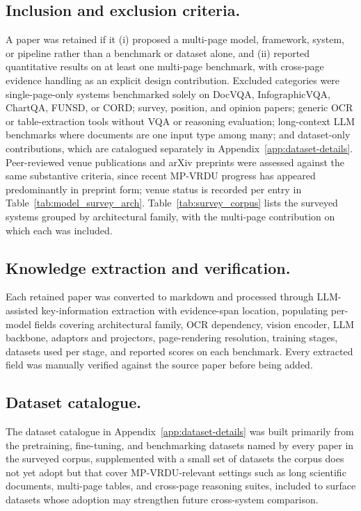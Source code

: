 \documentclass[11pt]{article}
\begin{document}
\subsection{Inclusion and exclusion criteria.}
A paper was retained if it (i) proposed a multi-page model, framework, system, or pipeline rather than a benchmark or dataset alone, and (ii) reported quantitative results on at least one multi-page benchmark, with cross-page evidence handling as an explicit design contribution. Excluded categories were single-page-only systems benchmarked solely on DocVQA, InfographicVQA, ChartQA, FUNSD, or CORD; survey, position, and opinion papers; generic OCR or table-extraction tools without VQA or reasoning evaluation; long-context LLM benchmarks where documents are one input type among many; and dataset-only contributions, which are catalogued separately in Appendix~\ref{app:dataset-details}. Peer-reviewed venue publications and arXiv preprints were assessed against the same substantive criteria, since recent MP-VRDU progress has appeared predominantly in preprint form; venue status is recorded per entry in Table~\ref{tab:model_survey_arch}. Table~\ref{tab:survey_corpus} lists the surveyed systems grouped by architectural family, with the multi-page contribution on which each was included.

\subsection{Knowledge extraction and verification.}
Each retained paper was converted to markdown and processed through LLM-assisted key-information extraction with evidence-span location, populating per-model fields covering architectural family, OCR dependency, vision encoder, LLM backbone, adaptors and projectors, page-rendering resolution, training stages, datasets used per stage, and reported scores on each benchmark. Every extracted field was manually verified against the source paper before being added.

\subsection{Dataset catalogue.}
The dataset catalogue in Appendix~\ref{app:dataset-details} was built primarily from the pretraining, fine-tuning, and benchmarking datasets named by every paper in the surveyed corpus, supplemented with a small set of datasets the corpus does not yet adopt but that cover MP-VRDU-relevant settings such as long scientific documents, multi-page tables, and cross-page reasoning suites, included to surface datasets whose adoption may strengthen future cross-system comparison.
\end{document}
